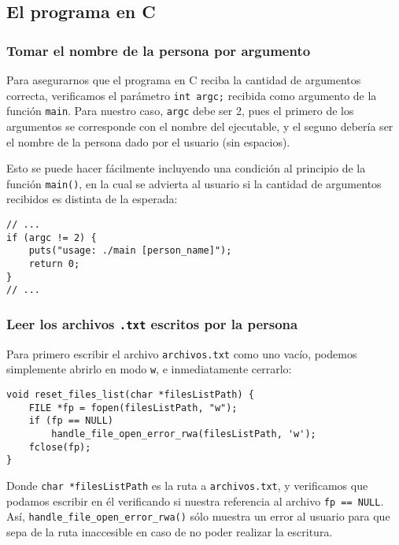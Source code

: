 \documentclass[a4paper]{article}
\begin{document}
\subsection{El programa en C}

\subsubsection{Tomar el nombre de la persona por argumento}

Para asegurarnos que el programa en C reciba la cantidad de argumentos correcta, verificamos el parámetro \texttt{int argc;} recibida como argumento de la función \texttt{main}. Para nuestro caso, \texttt{argc} debe ser 2, pues el primero de los argumentos se corresponde con el nombre del ejecutable, y el seguno debería ser el nombre de la persona dado por el usuario (sin espacios).

Esto se puede hacer fácilmente incluyendo una condición al principio de la función \texttt{main()}, en la cual se advierta al usuario si la cantidad de argumentos recibidos es distinta de la esperada:

\begin{verbatim}
// ...
if (argc != 2) {
    puts("usage: ./main [person_name]");
    return 0;
}
// ...
\end{verbatim}

\subsubsection{Leer los archivos \texttt{.txt} escritos por la persona}

Para primero escribir el archivo \texttt{archivos.txt} como uno vacío, podemos simplemente abrirlo en modo \texttt{w}, e inmediatamente cerrarlo:

\begin{verbatim}
void reset_files_list(char *filesListPath) {
    FILE *fp = fopen(filesListPath, "w");
    if (fp == NULL)
        handle_file_open_error_rwa(filesListPath, 'w');
    fclose(fp);
}
\end{verbatim}

Donde \texttt{char *filesListPath} es la ruta a \texttt{archivos.txt}, y verificamos que podamos escribir en él verificando si nuestra referencia al archivo \texttt{fp == NULL}. Así, \texttt{handle_file_open_error_rwa()} sólo muestra un error al usuario para que sepa de la ruta inaccesible en caso de no poder realizar la escritura.
\end{document}
